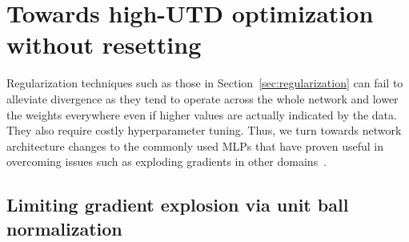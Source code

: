 \section{Towards high-UTD optimization without resetting} \label{sec:method}

Regularization techniques such as those in Section~\ref{sec:regularization} can fail to alleviate divergence as they tend to operate across the whole network and lower the weights everywhere even if higher values are actually indicated by the data. They also require costly hyperparameter tuning. Thus, we turn towards network architecture changes to the commonly used MLPs that have proven useful in overcoming issues such as exploding gradients in other domains~\parencite{ba2016layer, xu2019understanding}. 

\subsection{Limiting gradient explosion via unit ball normalization} \label{sec:unitball}

